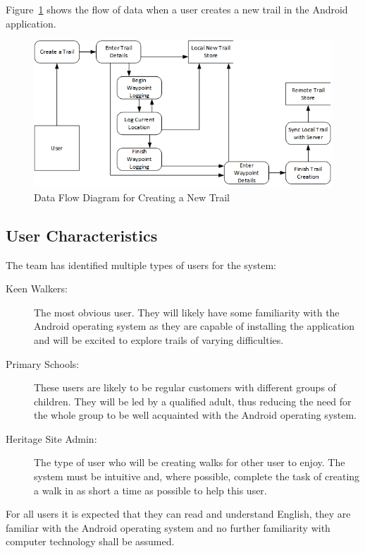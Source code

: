 \documentclass[11pt,a4paper]{article}
\begin{document}
Figure~\ref{fig:createTrailDFD} shows the flow of data when a user creates a new trail in the Android application.

\begin{figure}[H]
\begin{center}
\includegraphics[scale=0.65]{createTrailDFD.png}
\caption{Data Flow Diagram for Creating a New Trail}
\label{fig:createTrailDFD}
\end{center}
\end{figure}


\subsection{User Characteristics}
\label{sec:user-characteristics}

The team has identified multiple types of users for the system:
\begin{description}
\item[Keen Walkers:] The most obvious user. They will likely have some familiarity with the Android operating system as they are capable of installing the application and will be excited to explore trails of varying difficulties.
\item[Primary Schools:] These users are likely to be regular customers with different groups of children. They will be led by a qualified adult, thus reducing the need for the whole group to be well acquainted with the Android operating system.
\item[Heritage Site Admin:] The type of user who will be creating walks for other user to enjoy. The system must be intuitive and, where possible, complete the task of creating a walk in as short a time as possible to help this user.
\end{description}

For all users it is expected that they can read and understand English, they are familiar with the Android operating system and no further familiarity with computer technology shall be assumed.
\end{document}

